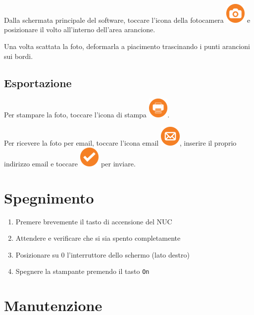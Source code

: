 \documentclass[12pt]{article}
\begin{document}
		Dalla schermata principale del software, toccare l'icona della fotocamera \includegraphics[width=1cm]{../src/resource/icons/camera.png} e posizionare il volto all'interno dell'area arancione.
		
		Una volta scattata la foto, deformarla a piacimento trascinando i punti arancioni sui bordi.        
	
	
	\subsection{Esportazione}
	
		Per stampare la foto, toccare l'icona di stampa \includegraphics[width=1cm]{../src/resource/icons/print.png}.
		
		Per ricevere la foto per email, toccare l'icona email \includegraphics[width=1cm]{../src/resource/icons/mail.png}, inserire il proprio indirizzo email e toccare \includegraphics[width=1cm]{../src/resource/icons/ok.png} per inviare.
		
	
	
\section{Spegnimento}
	
		\begin{enumerate}
			\item Premere brevemente il tasto di accensione del NUC
			\item Attendere e verificare che si sia spento completamente
			\item Posizionare su 0 l'interruttore dello schermo (lato destro)
			\item Spegnere la stampante premendo il tasto \texttt{On}
		\end{enumerate}
	
	
	
\section{Manutenzione}
\end{document}
